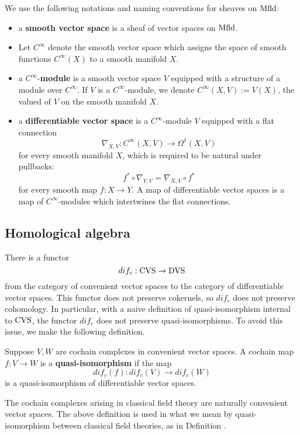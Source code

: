 \documentclass[10pt, oneside]{article}
\begin{document}
\begin{definition} 
We use the following notations and naming conventions for sheaves on ${\rm Mfld}$:
\begin{itemize}
\item a {\bf smooth vector space} is a sheaf of vector spaces on ${\rm Mfld}$.
\item Let $C^\infty$ denote the smooth vector space which assigns the space of smooth functions $C^\infty(X)$ to a smooth manifold $X$.
\item a $C^\infty$-{\bf module} is a smooth vector space $V$ equipped with a structure of a module over $C^\infty$. 
If $V$ is a $C^\infty$-module, we denote $C^\infty(X, V) := V(X)$, the valued of $V$ on the smooth manifold $X$.
\item a {\bf differentiable vector space} is a $C^\infty$-module $V$ equipped with a flat connection
\[
\nabla_{X,V} : C^\infty(X, V) \to \Omega^1(X, V)
\]
for every smooth manifold $X$, which is required to be natural under pullbacks:
\[
f^* \circ \nabla_{Y,V} = \nabla_{X,V} \circ f^*
\]
for every smooth map $f : X \to Y$. 
A map of differentiable vector spaces is a map of $C^\infty$-modules which intertwines the flat connections. 
\end{itemize}
\end{definition}

\subsection{Homological algebra}

There is a functor
\[
dif_c : {\rm CVS} \to {\rm DVS} 
\]
from the category of convenient vector spaces to the category of differentiable vector spaces. 
This functor does not preserve cokernels, so $dif_c$ does not preserve cohomology. 
In particular, with a naive definition of quasi-isomorphism internal to ${\rm CVS}$, the functor $dif_c$ does not preserve quasi-isomorphisms. 
To avoid this issue, we make the following definition. 

\begin{definition}
Suppose $V,W$ are cochain complexes in convenient vector spaces. 
A cochain map $f : V \to W$ is a {\bf quasi-isomorphism} if the map
\[
dif_c (f) : dif_c(V) \to dif_c(W)
\]
is a quasi-isomorphism of differentiable vector spaces.
\end{definition}

The cochain complexes arising in classical field theory are naturally convenient vector spaces. 
The above definition is used in what we mean by quasi-isomorphism between classical field theories, as in Definition .
\end{document}
